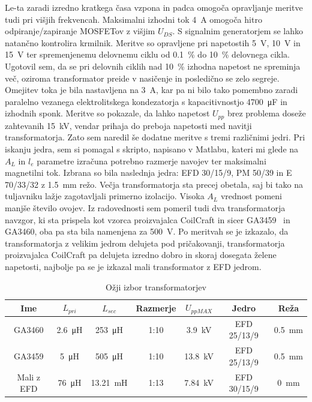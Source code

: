 \documentclass[a4paper,twoside,openright,12pt,Slovene]{book}
\begin{document}
Le-ta zaradi izredno kratkega časa vzpona in padca omogoča opravljanje meritve tudi pri višjih frekvencah. Maksimalni izhodni tok \SI{4}{\ampere} omogoča hitro odpiranje/zapiranje MOSFETov z višjim \(U_{DS}\). S signalnim generatorjem se lahko natančno kontrolira krmilnik. Meritve so opravljene pri napetostih \SI{5}{\volt}, \SI{10}{\volt} in \SI{15}{\volt} ter spremenjenemu delovnemu ciklu od \SI{0,1}{\percent} do \SI{10}{\percent} delovnega cikla. Ugotovil sem, da se pri delovnih ciklih nad \SI{10}{\percent} izhodna napetost ne spreminja več, oziroma transformator preide v nasičenje in posledično se zelo segreje. Omejitev toka je bila nastavljena na \SI{3}{\ampere}, kar pa ni bilo tako pomembno zaradi paralelno vezanega elektrolitskega kondezatorja s kapacitivnostjo \SI{4700}{\micro\farad} in izhodnih sponk. Meritve so pokazale, da lahko napetost \(U_{pp}\) brez problema doseže zahtevanih \SI{15}{\kilo\volt}, vendar prihaja do preboja napetosti med navitji transformatorja. Zato sem naredil še dodatne meritve s tremi različnimi jedri. Pri iskanju jedra, sem si pomagal s skripto, napisano v Matlabu, kateri mi glede na \(A_L\) in \(l_e\) parametre izračuna potrebno razmerje navojev ter maksimalni magnetilni tok. Izbrana so bila naslednja jedra: EFD 30/15/9, PM 50/39 in E 70/33/32 z \SI{1,5}{\milli\meter} režo. Večja transformatorja sta precej obetala, saj bi tako na tuljavniku lažje zagotavljali primerno izolacijo. Visoka \(A_L\) vrednost pomeni manjše število ovojev. Iz radovednosti sem pomeril tudi dva transformatorja navzgor, ki sta prispela kot vzorca proizvajalca CoilCraft in sicer GA3459~\cite{Coilcraft:GA3459} in GA3460, oba pa sta bila namenjena za \SI{500}{\volt}. Po meritvah se je izkazalo, da transformatorja z velikim jedrom delujeta pod pričakovanji, transformatorja proizvajalca CoilCraft pa delujeta izredno dobro in skoraj dosegata želene napetosti, najbolje pa se je izkazal mali transformator z EFD jedrom. 
 
\begin{table}[h!]
\centering
\begin{tabular}{||c|c|c|c|c|c|c||}
\hline
Ime & \(L_{pri}\) & \(L_{sec}\) & Razmerje & \(U_{pp MAX}\) & Jedro & Reža \\ [0.5ex]
\hline\hline
GA3460 & \SI{2.6}{\micro\henry} & \SI{253}{\micro\henry} & 1:10 & \SI{3.9}{\kilo\volt} & EFD 25/13/9 & \SI{0.5}{\milli\meter} \\
\hline
GA3459 & \SI{5}{\micro\henry} & \SI{505}{\micro\henry} & 1:10 & \SI{13.8}{\kilo\volt} & EFD 25/13/9 & \SI{0.5}{\milli\meter} \\
\hline
Mali z EFD & \SI{76}{\micro\henry} & \SI{13.21}{\milli\henry} & 1:13 & \SI{7.84}{\kilo\volt} & EFD 30/15/9 & \SI{0}{\milli\meter} \\
\hline
\end{tabular}

\caption{Ožji izbor transformatorjev}

\end{table}
\end{document}
